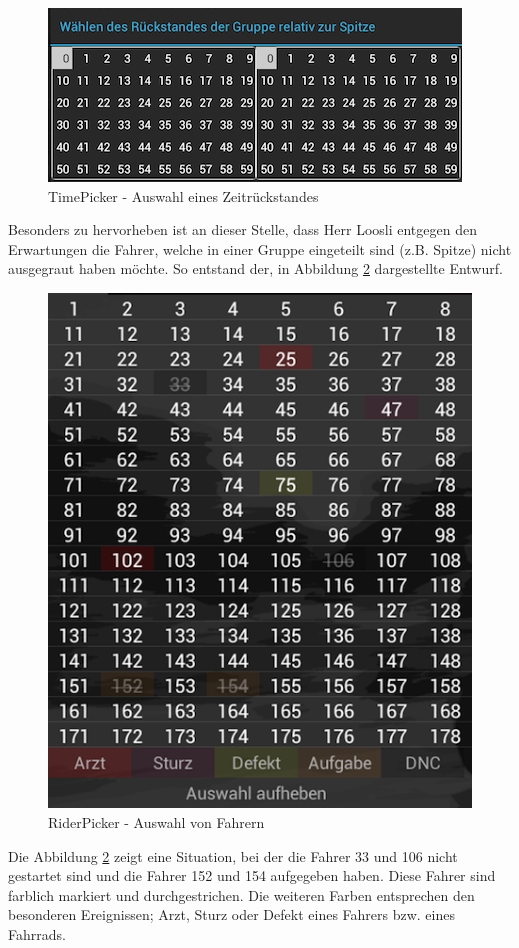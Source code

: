 \begin{figure}[h!]
\caption{TimePicker - Auswahl eines Zeitrückstandes}
\label{fig:timepicker}
\centering
\includegraphics[scale=0.8]{05bericht/images/timepicker.png}
\end{figure} 
Besonders zu hervorheben ist an dieser Stelle, dass Herr Loosli entgegen den Erwartungen die Fahrer, welche in einer Gruppe eingeteilt sind (z.B. Spitze) nicht ausgegraut haben möchte. So entstand der, in Abbildung \ref{fig:riderpicker} dargestellte Entwurf.

\begin{figure}[h!]
\caption{RiderPicker - Auswahl von Fahrern}
\label{fig:riderpicker}
\centering
\includegraphics[scale=0.5]{05bericht/images/riderpicker.png}
\end{figure}

Die Abbildung \ref{fig:riderpicker} zeigt eine Situation, bei der die Fahrer 33 und 106 nicht gestartet sind und die Fahrer 152 und 154 aufgegeben haben. Diese Fahrer sind farblich markiert und durchgestrichen. Die weiteren Farben entsprechen den besonderen Ereignissen; Arzt, Sturz oder Defekt eines Fahrers bzw. eines Fahrrads.
